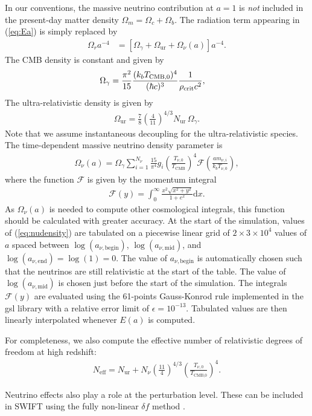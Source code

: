 In our conventions, the massive neutrino contribution at $a=1$ is \emph{not} included in the present-day matter density $\Omega_m=\Omega_c+\Omega_b$. The radiation term appearing in (\ref{eq:Ea}) is simply replaced by
\begin{align}
    \Omega_r a^{-4} &= \left[\Omega_\gamma + \Omega_\mathrm{ur} + \Omega_\nu(a)\right] a^{-4}.
\end{align}
The CMB density is constant and given by
%
\begin{align}
    \Omega_\gamma &= \frac{\pi^2}{15}\frac{(k_b T_\text{CMB,0})^4}{(\hbar c)^3}\frac{1}{\rho_{\rm crit}c^2},
\end{align}
The ultra-relativistic density is given by
\begin{align}
    \Omega_\mathrm{ur} = \frac{7}{8}\left(\frac{4}{11}\right)^{4/3} N_\mathrm{ur}\,\Omega_\gamma.
\end{align}
Note that we assume instantaneous decoupling for the ultra-relativistic species. The time-dependent massive neutrino density parameter is \citep{Zennaro2016}
\begin{align}
    \Omega_\nu(a) = \Omega_\gamma \sum_{i=1}^{N_\nu}\frac{15}{\pi^4}g_i\left(\frac{T_{\nu,0}}{T_\text{CMB}}\right)^4 \mathcal{F}\left(\frac{a m_{\nu,i}}{k_b T_{\nu,0}}\right), \label{eq:nudensity}
\end{align}
where the function $\mathcal{F}$ is given by the momentum integral
%
\begin{align}
    \mathcal{F}(y) = \int_0^{\infty} \frac{x^2\sqrt{x^2+y^2}}{1+e^{x}}\mathrm{d}x.
\end{align}
As $\Omega_\nu(a)$ is needed to compute other cosmological integrals, this function should be calculated with greater accuracy. At the start of the simulation, values of (\ref{eq:nudensity}) are tabulated on a piecewise linear grid of $2\times3\times10^4$ values of $a$ spaced between $\log(a_{\nu,\text{begin}})$, $\log(a_{\nu,\text{mid}})$, and $\log(a_{\nu,\text{end}}) = \log(1)=0$. The value of $a_{\nu,\text{begin}}$ is automatically chosen such that the neutrinos are still relativistic at the start of the table. The value of $\log(a_{\nu,\text{mid}})$ is chosen just before the start of the simulation. The integrals $\mathcal{F}(y)$ are evaluated using the 61-points Gauss-Konrod rule implemented in the {\sc gsl} library with a relative error limit of $\epsilon=10^{-13}$. Tabulated values are then linearly interpolated whenever $E(a)$ is computed.

For completeness, we also compute the effective number of relativistic degrees of freedom at high redshift:
\begin{align}
    N_\text{eff} = N_\mathrm{ur} + N_\nu\left(\frac{11}{4}\right)^{4/3}\left(\frac{T_{\nu,0}}{T_\text{CMB,0}}\right)^4.
\end{align}

Neutrino effects also play a role at the perturbation level. These can be included in SWIFT using the fully non-linear $\delta f$ method \citep{Elbers2020}.
